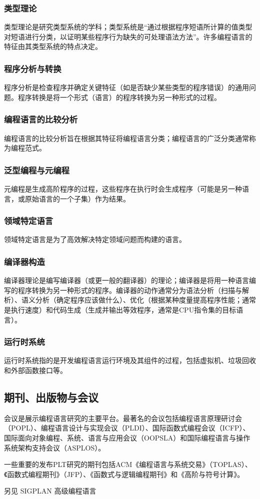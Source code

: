 \subsubsection{类型理论} 
类型理论是研究类型系统的学科；类型系统是“通过根据程序短语所计算的值类型对短语进行分类，以证明某些程序行为缺失的可处理语法方法”。许多编程语言的特征由其类型系统的特点决定。
\subsubsection{程序分析与转换}  
程序分析是检查程序并确定关键特征（如是否缺少某些类型的程序错误）的通用问题。程序转换是将一个形式（语言）的程序转换为另一种形式的过程。
\subsubsection{编程语言的比较分析} 
编程语言的比较分析旨在根据其特征将编程语言分类；编程语言的广泛分类通常称为编程范式。
\subsubsection{泛型编程与元编程} 
元编程是生成高阶程序的过程，这些程序在执行时会生成程序（可能是另一种语言，或原始语言的一个子集）作为结果。
\subsubsection{领域特定语言}  
领域特定语言是为了高效解决特定领域问题而构建的语言。
\subsubsection{编译器构造}    
编译器理论是编写编译器（或更一般的翻译器）的理论；编译器是将用一种语言编写的程序转换为另一种形式的程序。编译器的动作通常分为语法分析（扫描与解析）、语义分析（确定程序应该做什么）、优化（根据某种度量提高程序性能；通常是执行速度）和代码生成（生成并输出等效程序，通常是CPU指令集的目标语言）。
\subsubsection{运行时系统}  
运行时系统指的是开发编程语言运行环境及其组件的过程，包括虚拟机、垃圾回收和外部函数接口等。
\subsection{期刊、出版物与会议}  
会议是展示编程语言研究的主要平台。最著名的会议包括编程语言原理研讨会（POPL）、编程语言设计与实现会议（PLDI）、国际函数式编程会议（ICFP）、国际面向对象编程、系统、语言与应用会议（OOPSLA）和国际编程语言与操作系统架构支持会议（ASPLOS）。

一些重要的发布PLT研究的期刊包括ACM《编程语言与系统交易》（TOPLAS）、《函数式编程期刊》（JFP）、《函数式与逻辑编程期刊》和《高阶与符号计算》。

另见  
SIGPLAN  
高级编程语言